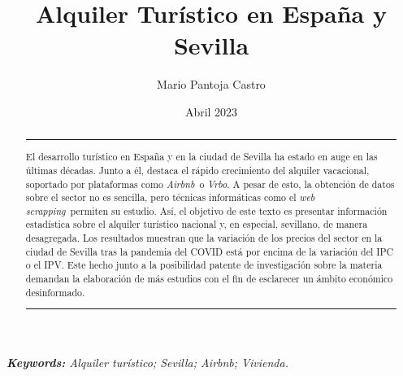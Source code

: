 \documentclass[a4paper,10pt]{article}
\title{Alquiler Turístico en España y Sevilla}
\author{Mario Pantoja Castro}
\date{Abril 2023}
\newcommand*{\airbnb}{\textit{Airbnb}}
\newcommand*{\webscrapping}{\textit{web scrapping}}
\begin{document}
    \maketitle

    \begin{abstract}
        \vspace{3mm}
        \hrule
        \vspace{2mm}
        \noindent
        El desarrollo turístico en España y en la ciudad de Sevilla ha estado en auge en las últimas décadas. Junto a él, destaca el rápido crecimiento
        del alquiler vacacional, soportado por plataformas como \airbnb \ o \textit{Vrbo}. A pesar de esto, la obtención de datos sobre el sector 
        no es sencilla, pero técnicas informáticas como el \webscrapping \ permiten su estudio. Así, el objetivo de este texto es presentar información
        estadística sobre el alquiler turístico nacional y, en especial, sevillano, de manera desagregada. Los resultados muestran que la variación de los 
        precios del sector en la ciudad de Sevilla tras la pandemia del COVID está por encima de la variación del IPC o el IPV. Este hecho junto a la posibilidad patente de investigación sobre la materia demandan la elaboración de más estudios con el fin de esclarecer un ámbito económico desinformado.
        \vspace{2mm}
        \hrule
    \end{abstract}
    \vspace{1mm}

    \textit{\textbf{Keywords:} Alquiler turístico; Sevilla; Airbnb; Vivienda.}
  
\end{document}
